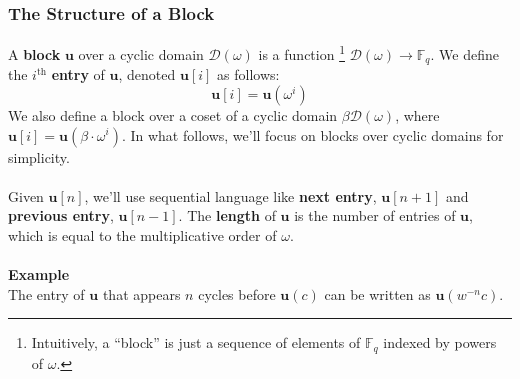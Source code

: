 \documentclass[10pt,letterpaper,titlepage]{article}
\newcommand{\GF}[1]{\mathbb{F}_{#1}}
\newcommand{\w}[0]{\omega}
\newcommand{\D}[0]{\mathcal{D}}
\theoremstyle{definition}
\begin{document}
\begin{appendices}
\subsubsection{The Structure of a Block}
\label{defining block}
A \textbf{block} $\mathbf{u}$ over a cyclic domain $\D(\w)$ is a function%
\footnote{Intuitively, a ``block'' is just a sequence of elements of $\GF{q}$ indexed by powers of $\w$.} $\D(\w)\to\GF{q}$.
We define the $i^\text{th}$ \textbf{entry} of $\mathbf{u}$, denoted $\mathbf{u}[i]$ as follows: \[\mathbf{u}[i]=\mathbf{u}(\w^i)\]
We also define a block over a coset of a cyclic domain $\beta\mathcal{D}(\w)$, where $\mathbf{u}[i]=\mathbf{u}(\beta\cdot\w^i)$.
In what follows, we'll focus on blocks over cyclic domains for simplicity. \\
\\Given $\mathbf{u}[n]$, we'll use sequential language like \textbf{next entry}, $\mathbf{u}[n+1]$ and \textbf{previous entry}, $\mathbf{u}[n-1]$.
The \textbf{length} of $\mathbf{u}$ is the number of entries of $\mathbf{u}$, which is equal to the multiplicative order of $\w$.\\
\\
\textbf{Example}\\
The entry of $\mathbf{u}$ that appears $n$ cycles before $\mathbf{u}(c)$ can be written as $\mathbf{u}(w^{-n}c)$. \\

\end{appendices}
\end{document}
